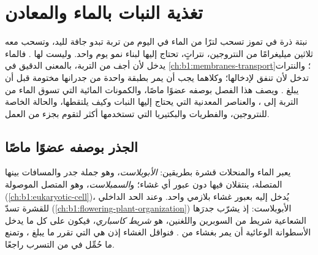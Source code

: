 \chapter{تغذية النبات بالماء والمعادن}\label{ch:b1:plant-water-minerals}

نبتة ذرة في تموز تسحب لترًا من الماء في اليوم من تربة تبدو جافة
لليد، وتسحب معه ثلاثين ميليغرامًا من النتروجين، نتراتٍ، تحتاج إليها
لبناء نمو يوم واحد. وليست لها . فالماء يدخل لأن  أجف من
التربة، بالمعنى الدقيق في \cref{ch:b1:membranes-transport}؛ والنترات
تدخل لأن   تنفق  لإدخالها؛ وكلاهما يجب أن يمر بطبقة
واحدة من  جدرانها مختومة  قبل أن يبلغ . ويصف هذا
الفصل  بوصفه عضوًا ماصًا، والكمونات المائية التي تسوق الماء من
التربة إلى ، والعناصر المعدنية التي يحتاج إليها النبات وكيف
يلتقطها، والحالة الخاصة للنتروجين، والفطريات والبكتيريا التي
تستخدمها أكثر  لتقوم بجزء من العمل.

\section{الجذر بوصفه عضوًا ماصًا}

\begin{definition}\label{def:b1:plant-water-minerals:pathways}
يعبر الماء والمنحلات قشرة  بطريقين: \emph{الأبوبلاست}، وهو
جملة جدر  والمسافات بينها المتصلة، ينتقلان فيها دون عبور أي
غشاء؛ و\emph{السمبلاست}، وهو   المتصل الموصولة
 (\cref{ch:b1:eukaryotic-cell})، يُدخل إليه بعبور
غشاء بلازمي واحد. وعند الحد الداخلي للقشرة تسدّ \emph{} (\cref{ch:b1:flowering-plant-organization}) الأبوبلاست:
إذ يشرّب جدرَها الشعاعية شريط من السوبرين واللغنين، هو \emph{شريط
كاسباري}، فيكون على كل ما يدخل الأسطوانة الوعائية أن يمر بغشاء 
من . فنواقل الغشاء إذن هي التي تقرر ما يبلغ ،
وتمنع ما حُمِّل في  من التسرب راجعًا.
\end{definition}

